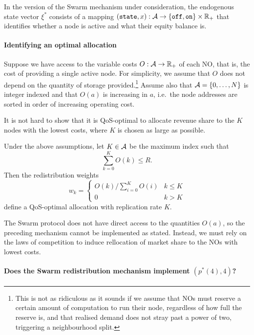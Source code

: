 \begin{example*}In the version of the Swarm mechanism under consideration, the endogenous state vector $\xi^*$ consists of a mapping $(\mathtt{state},x):\mathcal{A}\rightarrow \{\mathtt{off},\mathtt{on}\}\times\mathbb{R}_+$ that identifies whether a node is active and what their equity balance is.
\end{example*}

\paragraph{Identifying an optimal allocation}
Suppose we have access to the variable costs $O:\mathcal{A}\rightarrow\mathbb{R}_+$ of each NO, that is, the cost of providing a single active node.
%
For simplicity, we assume that $O$ does not depend on the quantity of storage provided.\footnote{This is not as ridiculous as it sounds if we assume that NOs must reserve a certain amount of computation to run their node, regardless of how full the reserve is, and that realised demand does not stray past a power of two, triggering a neighbourhood split.}
%
Assume also that $\mathcal{A}=\{0,\ldots,N\}$ is integer indexed and that $O(a)$ is increasing in $a$, i.e.~the node addresses are sorted in order of increasing operating cost.

It is not hard to show that it is QoS-optimal to allocate revenue share to the $K$ nodes with the lowest costs, where $K$ is chosen as large as possible.
%
\begin{proposition*}
  Under the above assumptions, let $K\in\mathcal{A}$ be the maximum index such that
  \[
    \sum_{k=0}^KO(k) \leq R.
  \]
  Then the redistribution weights
  \[
    w_k = \left\{ \begin{array}{ll}
      O(k)/\sum_{i=0}^KO(i) & k\leq K \\
      0 & k > K
    \end{array} \right.
  \]
  define a QoS-optimal allocation with replication rate $K$.
\end{proposition*}

The Swarm protocol does not have direct access to the quantities $O(a)$, so the preceding mechanism cannot be implemented as stated.
%
Instead, we must rely on the laws of competition to induce rellocation of market share to the NOs with lowest costs.

\paragraph{Does the Swarm redistribution mechanism implement $(p^*(4),4)$?}

